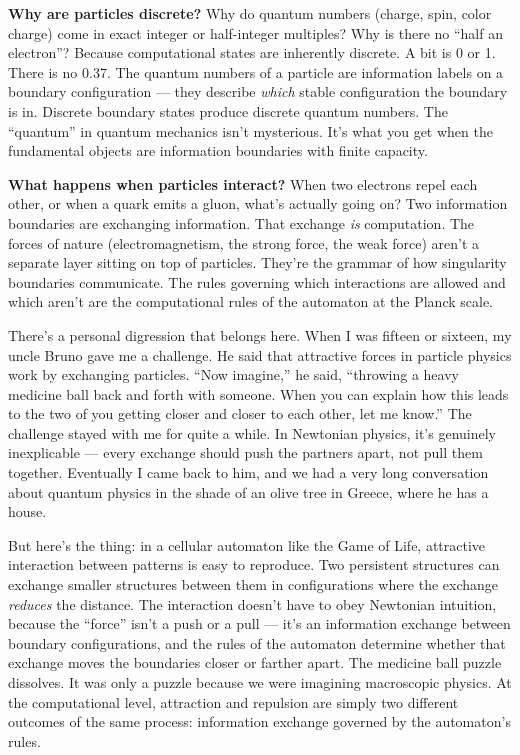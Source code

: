 \documentclass[11pt, twoside, openright]{book}
\begin{document}
\textbf{Why are particles discrete?} Why do quantum numbers (charge, spin, color charge) come in exact integer or half-integer multiples? Why is there no ``half an electron''? Because computational states are inherently discrete. A bit is 0 or 1. There is no 0.37. The quantum numbers of a particle are information labels on a boundary configuration --- they describe \textit{which} stable configuration the boundary is in. Discrete boundary states produce discrete quantum numbers. The ``quantum'' in quantum mechanics isn't mysterious. It's what you get when the fundamental objects are information boundaries with finite capacity.

\textbf{What happens when particles interact?} When two electrons repel each other, or when a quark emits a gluon, what's actually going on? Two information boundaries are exchanging information. That exchange \textit{is} computation. The forces of nature (electromagnetism, the strong force, the weak force) aren't a separate layer sitting on top of particles. They're the grammar of how singularity boundaries communicate. The rules governing which interactions are allowed and which aren't are the computational rules of the automaton at the Planck scale.

There's a personal digression that belongs here. When I was fifteen or sixteen, my uncle Bruno gave me a challenge. He said that attractive forces in particle physics work by exchanging particles. ``Now imagine,'' he said, ``throwing a heavy medicine ball back and forth with someone. When you can explain how this leads to the two of you getting closer and closer to each other, let me know.'' The challenge stayed with me for quite a while. In Newtonian physics, it's genuinely inexplicable --- every exchange should push the partners apart, not pull them together. Eventually I came back to him, and we had a very long conversation about quantum physics in the shade of an olive tree in Greece, where he has a house.

But here's the thing: in a cellular automaton like the Game of Life, attractive interaction between patterns is easy to reproduce. Two persistent structures can exchange smaller structures between them in configurations where the exchange \textit{reduces} the distance. The interaction doesn't have to obey Newtonian intuition, because the ``force'' isn't a push or a pull --- it's an information exchange between boundary configurations, and the rules of the automaton determine whether that exchange moves the boundaries closer or farther apart. The medicine ball puzzle dissolves. It was only a puzzle because we were imagining macroscopic physics. At the computational level, attraction and repulsion are simply two different outcomes of the same process: information exchange governed by the automaton's rules.
\end{document}
